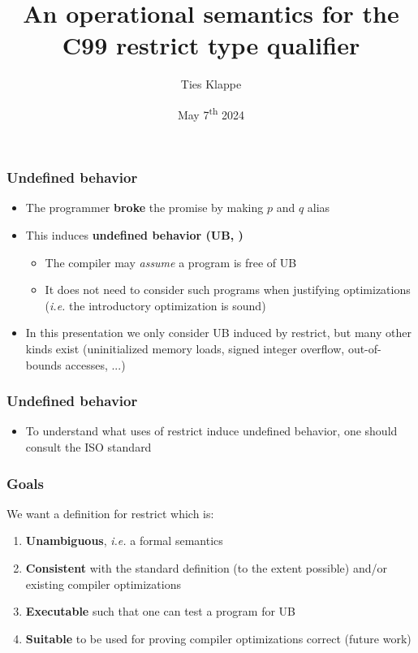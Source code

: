 \documentclass[aspectratio=169, c]{beamer}
\title{An operational semantics for the C99 restrict type qualifier}
\author{Ties Klappe}
\institute{Radboud University}
\date{May 7\textsuperscript{th} 2024}
\makeatletter
\def\ie{\textit{i.e.}\@\xspace}
\makeatother
\begin{document}
\setlength{\fboxsep}{0pt}

\frame{\titlepage}





\begin{frame}
\frametitle{Undefined behavior}
\begin{itemize}
    \item The programmer \textbf{broke} the promise by making $p$ and $q$ alias
    \item This induces \textbf{undefined behavior (UB, \rsub)}
    \begin{itemize}
        \item The compiler may \textit{assume} a program is free of UB
        \item It does not need to consider such programs when justifying optimizations (\ie the introductory optimization is sound)
    \end{itemize}
    \item In this presentation we only consider UB induced by restrict, but many other kinds exist
    (uninitialized memory loads, signed integer overflow, out-of-bounds accesses, ...)
\end{itemize}

\end{frame}

\begin{frame}
\frametitle{Undefined behavior}
\begin{itemize}
    \item To understand what uses of restrict induce undefined behavior, one should consult the ISO standard
\end{itemize}
\end{frame}



\begin{frame}
\frametitle{Goals}

We want a definition for restrict which is: \\
\begin{enumerate}
    \item \textbf{Unambiguous}, \ie a formal semantics
    \item \textbf{Consistent} with the standard definition (to the extent possible) and/or existing compiler optimizations
    \item \textbf{Executable} such that one can test a program for UB 
    \item \textbf{Suitable} to be used for proving compiler optimizations correct (future work)
\end{enumerate}

\end{frame}
\end{document}
